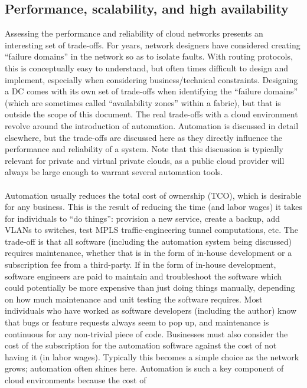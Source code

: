 \subsection{Performance, scalability, and high availability}
Assessing the performance and reliability of cloud networks presents an
interesting set of trade-offs. For years, network designers have considered
creating ``failure domains'' in the network so as to isolate faults. With
routing protocols, this is conceptually easy to understand, but often times
difficult to design and implement, especially when considering
business/technical constraints. Designing a DC comes with its own set of
trade-offs when identifying the ``failure domains'' (which are sometimes called
``availability zones'' within a fabric), but that is outside the scope of this
document. The real trade-offs with a cloud environment revolve around the
introduction of automation. Automation is discussed in detail elsewhere,
but the trade-offs are discussed here as they directly influence the
performance and reliability of a system. Note that this discussion is
typically relevant for private and virtual private clouds, as a public cloud
provider will always be large enough to warrant several automation tools.
\\ \\
Automation usually reduces the total cost of ownership (TCO), which is
desirable for any business. This is the result of reducing the time (and labor
wages) it takes for individuals to ``do things'': provision a new service,
create a backup, add VLANs to switches, test MPLS traffic-engineering tunnel
computations, etc. The trade-off is that all software (including the
automation system being discussed) requires maintenance, whether that is in
the form of in-house development or a subscription fee from a third-party. If
in the form of in-house development, software engineers are paid to maintain
and troubleshoot the software which could potentially be more expensive than
just doing things manually, depending on how much maintenance and unit testing
the software requires. Most individuals who have worked as software developers
(including the author) know that bugs or feature requests always seem to pop
up, and maintenance is continuous for any non-trivial piece of code.
Businesses must also consider the cost of the subscription for the automation
software against the cost of not having it (in labor wages). Typically this
becomes a simple choice as the network grows; automation often shines here.
Automation is such a key component of cloud environments because the cost of
